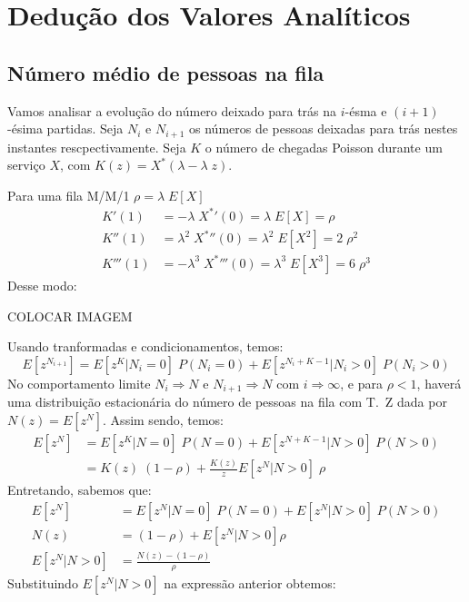 \documentclass[a4paper]{article}
\newcommand{\E}[1]{E\!\left[#1\right]}
\begin{document}
\newpage
\section{Dedução dos Valores Analíticos}
\subsection{Número médio de pessoas na fila}
Vamos analisar a evolução do número
deixado para trás na \(i\)-ésma e \((i+1)\)-ésima partidas.
Seja \(N_i\) e  \(N_{i+1}\) os números de pessoas
deixadas para trás nestes instantes rescpectivamente.
Seja \(K\) o número de chegadas Poisson
durante um serviço \(X\),
com \(K(z) = X^*(\lambda - \lambda \; z)\).

Para uma fila M/M/1 \(\rho = \lambda \; \E{X}\)
\begin{align*}
    K'(1) &= -\lambda \; {X^*}'(0) = \lambda \; \E{X}
        = \rho \\
    K''(1) &= \lambda^2 \; {X^*}''(0)
        = \lambda^2 \; \E{X^2} = 2 \; \rho^2 \\
    K'''(1) &= - \lambda^3 \; {X^*}'''(0)
        = \lambda^3 \; \E{X^3} = 6 \; \rho^3
\end{align*}
Desse modo:
\begin{center}
    COLOCAR IMAGEM
\end{center}
Usando tranformadas e condicionamentos, temos:
\[
    \E{z^{N_{i+1}}}
        = \E{z^{K} | N_i = 0} \; P(N_i = 0)
        + \E{z^{N_{i}+K-1} | N_i > 0} \; P(N_i > 0)
\]
No comportamento limite
\(N_i \Rightarrow N\) e \(N_{i+1} \Rightarrow N\)
com \(i \Rightarrow \infty\),
e para \(\rho < 1 \),
haverá uma distribuição estacionária
do número de pessoas na fila com T.~Z dada por
\(N(z) = \E{z^N}\).
Assim sendo, temos:
\begin{align*}
    \E{z^N} &= \E{z^K | N = 0} \; P(N = 0)
        + \E{z^{N+K-1} | N>0} \; P(N > 0) \\
    &= K(z) \; (1 - \rho)
        + \frac{K(z)}{z} \E{z^N | N > 0} \; \rho
\end{align*}
Entretando, sabemos que:
\begin{align*}
    \E{z^N} &= \E{z^N| N = 0} \; P(N = 0)
        + \E{z^N  | N > 0} \; P(N > 0) \\
    N(z) &= (1 - \rho) + \E{z^N | N > 0} \rho \\
    \E{z^N | N > 0} &= \frac{N(z) - (1 - \rho)}{\rho}
\end{align*}
Substituindo \(\E{z^N | N > 0}\)
na expressão anterior obtemos:
\end{document}
